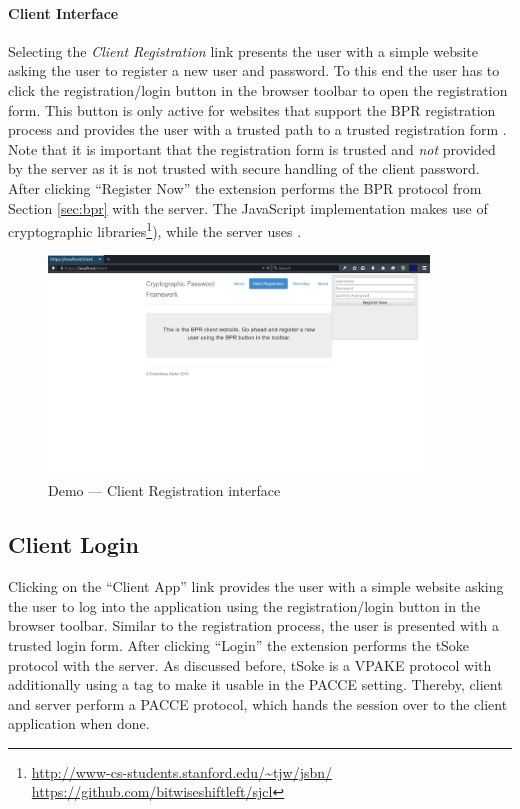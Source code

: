 \paragraph{Client Interface}
Selecting the \emph{Client Registration} link presents the user with a simple website asking the user to register a new user and password.
To this end the user has to click the registration/login button in the browser toolbar to open the registration form.
This button is only active for websites that support the \ac{BPR} registration process and provides the user with a trusted path to a trusted registration form \cite{}.
Note that it is important that the registration form is trusted and \emph{not} provided by the server as it is not trusted with secure handling of the client password.
After clicking ``Register Now'' the extension performs the \ac{BPR} protocol from Section \ref{sec:bpr} with the server.
The JavaScript implementation makes use of cryptographic libraries\footnote{\url{http://www-cs-students.stanford.edu/~tjw/jsbn/}\\\url{https://github.com/bitwiseshiftleft/sjcl}}), while the server uses \cite{charm13}.

\begin{figure}[tbph]
\centering
\includegraphics[width=0.9\textwidth]{Figs/demo-register-popup.png}
\caption{Demo --- Client Registration interface}\label{fig:demo-register}
\end{figure}

\subsection{Client Login}
Clicking on the ``Client App'' link provides the user with a simple website asking the user to log into the application using the registration/login button in the browser toolbar.
Similar to the registration process, the user is presented with a trusted login form.
After clicking ``Login'' the extension performs the tSoke protocol with the server.
As discussed before, tSoke is a \ac{VPAKE} protocol with additionally using a tag to make it usable in the \ac{PACCE} setting.
Thereby, client and server perform a \ac{PACCE} protocol, which hands the session over to the client application when done.

